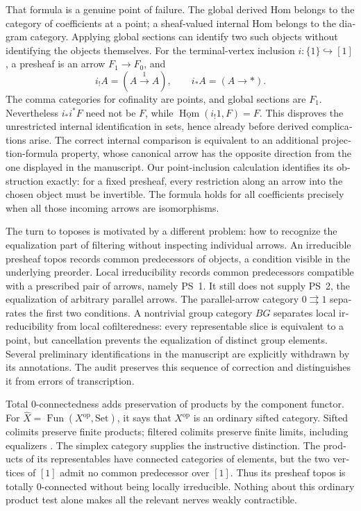 \begin{otherlanguage}{english}
That formula is a genuine point of failure. The global derived Hom belongs to the category of coefficients at a point; a sheaf-valued internal Hom belongs to the diagram category. Applying global sections can identify two such objects without identifying the objects themselves. For the terminal-vertex inclusion $i:\{1\}\hookrightarrow[1]$, a presheaf is an arrow $F_1\to F_0$, and
\[
 i_!A=(A\xrightarrow{1}A),\qquad i_*A=(A\to *).
\]
The comma categories for cofinality are points, and global sections are $F_1$. Nevertheless $i_*i^*F$ need not be $F$, while $\underline{\operatorname{Hom}}(i_!1,F)=F$. This disproves the unrestricted internal identification in sets, hence already before derived complications arise. The correct internal comparison is equivalent to an additional projection-formula property, whose canonical arrow has the opposite direction from the one displayed in the manuscript. Our point-inclusion calculation identifies its obstruction exactly: for a fixed presheaf, every restriction along an arrow into the chosen object must be invertible. The formula holds for all coefficients precisely when all those incoming arrows are isomorphisms.

The turn to toposes is motivated by a different problem: how to recognize the equalization part of filtering without inspecting individual arrows. An irreducible presheaf topos records common predecessors of objects, a condition visible in the underlying preorder. Local irreducibility records common predecessors compatible with a prescribed pair of arrows, namely PS~1. It still does not supply PS~2, the equalization of arbitrary parallel arrows. The parallel-arrow category $0\rightrightarrows1$ separates the first two conditions. A nontrivial group category $BG$ separates local irreducibility from local cofilteredness: every representable slice is equivalent to a point, but cancellation prevents the equalization of distinct group elements. Several preliminary identifications in the manuscript are explicitly withdrawn by its annotations. The audit preserves this sequence of correction and distinguishes it from errors of transcription.

Total $0$-connectedness adds preservation of products by the component functor. For $\widehat X=\operatorname{Fun}(X^{\mathrm{op}},\mathrm{Set})$, it says that $X^{\mathrm{op}}$ is an ordinary sifted category. Sifted colimits preserve finite products; filtered colimits preserve finite limits, including equalizers \citep{AdamekRosickyVitale2010}. The simplex category supplies the instructive distinction. The products of its representables have connected categories of elements, but the two vertices of $[1]$ admit no common predecessor over $[1]$. Thus its presheaf topos is totally $0$-connected without being locally irreducible. Nothing about this ordinary product test alone makes all the relevant nerves weakly contractible.


\end{otherlanguage}
